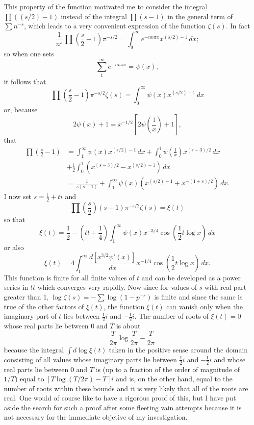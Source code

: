 This property of the function motivated me to consider the integral 
$\prod ((s/2) - 1)$ instead of the integral $\prod(s-1)$ in the general
term of $\sum n^{-s}$, which leads to a very convenient expression of
the function $\zeta(s)$. In fact
%
\[
\frac{1}{n^s}\prod\left(\frac{s}{2} - 1\right)\pi^{-s/2}
= \int_0^{\infty} e^{-nn\pi x}x^{(s/2) - 1} \, dx;
\]
%
so when one sets
%
\[
\sum_{1}^{\infty} e^{-nn\pi x} = \psi(x),
\]
%
it follows that
%
\[
\prod\left(\frac{s}{2} - 1\right)\pi^{-s/2}\zeta(s)
= \int_0^{\infty} \psi(x)x^{(s/2) - 1} \, dx
\]
%
or, because
%
\begin{equation*}
\tag{Jacobi, Fund., p. 184}
2\psi(x) + 1 = x^{-1/2}\left[ 2\psi\left(\frac{1}{x}\right) + 1 \right],
\end{equation*}
%
that
%
\begin{align*}
    \prod\left(\frac{s}{2} - 1\right) 
    &= \int_1^{\infty} \psi(x)x^{(s/2) - 1} \, dx
    + \int_0^1 \psi\left(\frac{1}{x}\right) x^{(s-3)/2} \, dx \\
    &+ \frac{1}{2}\int_0^1 (x^{(s-3)/2} - x^{(s/2) - 1}) \, dx \\
    &= \frac{1}{s(s-1)} 
    + \int_1^{\infty} \psi(x)(x^{(s/2) - 1} + x^{-(1+s)/2}) \, dx.
\end{align*}
%
I now set $s = \frac{1}{2} + ti$ and
%
\[
\prod\left(\frac{s}{2}\right)(s-1)\pi^{-s/2}\zeta(s) = \xi(t)
\]
%
so that
%
\[
\xi(t) = \frac{1}{2} - 
\left(tt + \frac{1}{4}\right)\int_1^{\infty} \psi(x)x^{-3/4}
\cos\left(\frac{1}{2}t\log x\right) \, dx
\]
%
or also
%
\[
\xi(t) = 4\int_1^{\infty} \frac{d[x^{3/2}\psi'(x)]}{dx}
x^{-1/4}\cos\left(\frac{1}{2}t\log x\right) \, dx.
\]
%
This function is finite for all finite values of $t$ and can be developed
as a power series in $tt$ which converges very rapidly. Now since for values
of $s$ with real part greater than 1, $\log\zeta(s) = - \sum \log(1 - p^{-s})$
is finite and since the same is true of the other factors of $\xi(t)$, the
function $\xi(t)$ can vanish only when the imaginary part of $t$ lies
between $\frac{1}{2}i$ and $-\frac{1}{2}i$. The number of roots of $\xi(t) = 0$
whose real parts lie between 0 and $T$ is about
%
\[
= \frac{T}{2\pi}\log\frac{T}{2\pi} - \frac{T}{2\pi}
\]
%
because the integral $\int d\log\xi(t)$ taken in the positive sense around the
domain consisting of all values whose imaginary parts lie between $\frac{1}{2}i$
and $-\frac{1}{2}i$ and whose real parts lie between 0 and $T$ is
(up to a fraction of the order of magnitude of $1/T$) equal to
$[T\log(T/2\pi) - T]i$ and is, on the other hand, equal to the number
of roots within these bounds and it is very likely that all of the
roots are real. One would of course like to have a rigorous proof
of this, but I have put aside the search for such a proof after some fleeting
vain attempts because it is not necessary for the immediate objetive of my
investigation.

